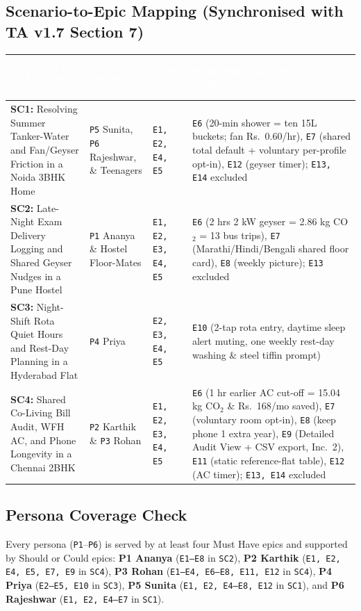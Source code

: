 \documentclass[12pt, a4paper]{article}
\begin{document}
\subsection{Scenario-to-Epic Mapping (Synchronised with TA v1.7 Section 7)}
{\footnotesize
{}
\begin{longtable}{|>{\raggedright\arraybackslash}p{5.3cm}|>{\raggedright\arraybackslash}p{2.8cm}|>{\raggedright\arraybackslash}p{2.3cm}|>{\raggedright\arraybackslash}p{5.6cm}|}
\hline
\rowcolor{cNavy}
\textcolor{white}{\textbf{Scenario (TA v1.7 Section 7)}} & \textcolor{white}{\textbf{Personas}} & \textcolor{white}{\textbf{Must Epics}} & \textcolor{white}{\textbf{Supporting Epics (\& Exclusions)}} \\
\hline
\textbf{SC1:} Resolving Summer Tanker-Water and Fan/Geyser Friction in a Noida 3BHK Home & \texttt{P5} Sunita, \texttt{P6} Rajeshwar, \& Teenagers & \texttt{E1, E2, E4, E5} & \texttt{E6} (20-min shower = ten 15L buckets; fan Rs.\ 0.60/hr), \texttt{E7} (shared total default + voluntary per-profile opt-in), \texttt{E12} (geyser timer); \texttt{E13, E14} excluded \\
\hline
\textbf{SC2:} Late-Night Exam Delivery Logging and Shared Geyser Nudges in a Pune Hostel & \texttt{P1} Ananya \& Hostel Floor-Mates & \texttt{E1, E2, E3, E4, E5} & \texttt{E6} (2 hrs 2 kW geyser = 2.86 kg CO$_2$ = 13 bus trips), \texttt{E7} (Marathi/Hindi/Bengali shared floor card), \texttt{E8} (weekly picture); \texttt{E13} excluded \\
\hline
\textbf{SC3:} Night-Shift Rota Quiet Hours and Rest-Day Planning in a Hyderabad Flat & \texttt{P4} Priya & \texttt{E2, E3, E4, E5} & \texttt{E10} (2-tap rota entry, daytime sleep alert muting, one weekly rest-day washing \& steel tiffin prompt) \\
\hline
\textbf{SC4:} Shared Co-Living Bill Audit, WFH AC, and Phone Longevity in a Chennai 2BHK & \texttt{P2} Karthik \& \texttt{P3} Rohan & \texttt{E1, E2, E3, E4, E5} & \texttt{E6} (1 hr earlier AC cut-off = 15.04 kg CO$_2$ \& Rs.\ 168/mo saved), \texttt{E7} (voluntary room opt-in), \texttt{E8} (keep phone 1 extra year), \texttt{E9} (Detailed Audit View + CSV export, Inc.\ 2), \texttt{E11} (static reference-flat table), \texttt{E12} (AC timer); \texttt{E13, E14} excluded \\
\hline
\end{longtable}
}

\subsection{Persona Coverage Check}
Every persona (\texttt{P1}--\texttt{P6}) is served by at least four Must Have epics and supported by Should or Could epics: \textbf{P1 Ananya} (\texttt{E1--E8} in \texttt{SC2}), \textbf{P2 Karthik} (\texttt{E1, E2, E4, E5, E7, E9} in \texttt{SC4}), \textbf{P3 Rohan} (\texttt{E1--E4, E6--E8, E11, E12} in \texttt{SC4}), \textbf{P4 Priya} (\texttt{E2--E5, E10} in \texttt{SC3}), \textbf{P5 Sunita} (\texttt{E1, E2, E4--E8, E12} in \texttt{SC1}), and \textbf{P6 Rajeshwar} (\texttt{E1, E2, E4--E7} in \texttt{SC1}).
\end{document}
